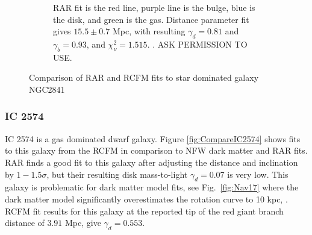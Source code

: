 \documentclass[reprint,%
 amsmath,amssymb,
 aps,
]{revtex4-1}
\begin{document}
\begin{figure}[ht]
\begin{subfigure}[b]{0.5\linewidth}
    \caption{RAR fit is the red line, purple line is the bulge, blue is the disk, and green  is the gas.   Distance parameter fit gives    $15.5\pm 0.7$ Mpc, with resulting $\gamma_d =0.81 $ and $\gamma_b =	0.93 $, and   $\chi^2_\nu = 1.515$. \citet{Li_2018}.  ASK PERMISSION TO USE. } 
    \label{fig:2841Li2018Rar} 
    \vspace{4ex}
  \end{subfigure} 
  \caption{Comparison of RAR and RCFM fits to star dominated galaxy NGC2841 }
  \label{fig:CompareNGC2841} 
\end{figure}

\subsubsection{IC 2574}

IC 2574 is  a gas dominated dwarf galaxy.
Figure \ref{fig:CompareIC2574} shows   fits to this galaxy from  the  RCFM in comparison to  NFW dark matter and RAR fits. 
 RAR finds a good fit to this galaxy    after adjusting
the  distance and inclination by $1-1.5 \sigma$, but their resulting disk mass-to-light 
$\gamma_d  = 0.07$ is  very low. 
This galaxy is   problematic for dark matter model fits, see Fig.~\ref{fig:Nav17} where the dark matter model significantly overestimates  the rotation curve to 10 kpc, \cite{2017MNRAS.471.1841N}.  
RCFM fit results for this galaxy at the reported  tip of the red giant branch distance  of  $3.91$ Mpc,  give  $\gamma_d = 0.553$. 
\end{document}
